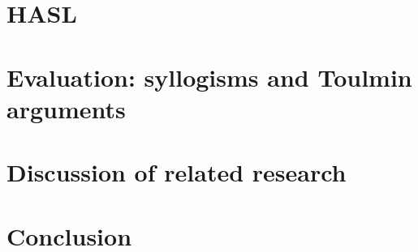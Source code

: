 \documentclass{IOS-Book-Article}
\begin{document}
\section{HASL}


\section{Evaluation: syllogisms and Toulmin arguments}



\section{Discussion of related research}


\section{Conclusion}


%
%
%
%
%
%
%
%
%
%
%
%
%





\end{document}
